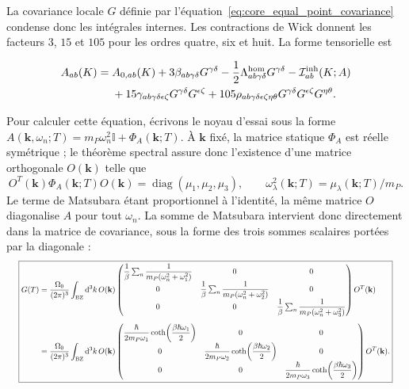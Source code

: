 La covariance locale $G$ définie par
l'équation~\eqref{eq:core_equal_point_covariance} condense donc les intégrales
internes. Les contractions de Wick donnent les facteurs $3$, $15$ et $105$
pour les ordres quatre, six et huit. La forme tensorielle est
\begin{mdframed}[linecolor=red!60!black,nobreak=true]
\small
\begin{equation}
\begin{aligned}
A_{ab}(K)={}&A_{0,ab}(K)
+3\beta_{ab\gamma\delta}G^{\gamma\delta}
-\frac12\Lambda^{\rm hom}_{ab\gamma\delta}G^{\gamma\delta}
-\mathcal I^{\rm inh}_{ab}(K;A)\\
&+15\gamma_{ab\gamma\delta\epsilon\zeta}
G^{\gamma\delta}G^{\epsilon\zeta}
+105\rho_{ab\gamma\delta\epsilon\zeta\eta\theta}
G^{\gamma\delta}G^{\epsilon\zeta}G^{\eta\theta}.
\end{aligned}
\label{eq:core_full_scha_tensor}
\end{equation}
\end{mdframed}
Pour calculer cette équation, écrivons le
noyau d'essai sous la forme
$A(\mathbf k,\omega_n;T)=m_P\omega_n^2\mathbb I+\Phi_A(\mathbf k;T)$.
À $\mathbf k$ fixé, la matrice statique $\Phi_A$ est réelle symétrique ; le
théorème spectral assure donc l'existence d'une matrice orthogonale
$O(\mathbf k)$ telle que
\begin{equation}
O^T(\mathbf k)\Phi_A(\mathbf k;T)O(\mathbf k)
=\operatorname{diag}(\mu_1,\mu_2,\mu_3),
\qquad
\omega_\lambda^2(\mathbf k;T)=\mu_\lambda(\mathbf k;T)/m_P.
\label{eq:core_trial_kernel_diagonalization}
\end{equation}
Le terme de Matsubara étant proportionnel à l'identité, la même matrice $O$
diagonalise $A$ pour tout $\omega_n$. La somme de Matsubara intervient donc
directement dans la matrice de covariance, sous la forme des trois sommes
scalaires portées par la diagonale :
\begin{equation}
\resizebox{0.98\textwidth}{!}{$\displaystyle\boxed{
\begin{aligned}
G(T)
={}&\frac{\Omega_0}{(2\pi)^3}\int_{\rm BZ}\mathrm d^3k\,
O(\mathbf k)
\begin{pmatrix}
\dfrac{1}{\beta}\sum_n\dfrac{1}{m_P(\omega_n^2+\omega_1^2)}&0&0\\[5pt]
0&\dfrac{1}{\beta}\sum_n\dfrac{1}{m_P(\omega_n^2+\omega_2^2)}&0\\[5pt]
0&0&\dfrac{1}{\beta}\sum_n\dfrac{1}{m_P(\omega_n^2+\omega_3^2)}
\end{pmatrix}
O^T(\mathbf k)\\[5pt]
={}&\frac{\Omega_0}{(2\pi)^3}\int_{\rm BZ}\mathrm d^3k\,
O(\mathbf k)
\begin{pmatrix}
\dfrac{\hbar}{2m_P\omega_1}\coth\!\left(\dfrac{\beta\hbar\omega_1}{2}\right)&0&0\\[5pt]
0&\dfrac{\hbar}{2m_P\omega_2}\coth\!\left(\dfrac{\beta\hbar\omega_2}{2}\right)&0\\[5pt]
0&0&\dfrac{\hbar}{2m_P\omega_3}\coth\!\left(\dfrac{\beta\hbar\omega_3}{2}\right)
\end{pmatrix}
O^T(\mathbf k).
\end{aligned}}$}
\label{eq:core_physical_covariance}
\end{equation}
